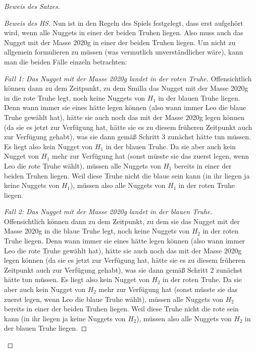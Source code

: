 \begin{proof}[Beweis des Satzes]
\begin{proof}[Beweis des HS]
        Nun ist in den Regeln des Spiels festgelegt, dass erst aufgehört wird, wenn alle Nuggets in einer der beiden 
        Truhen liegen. Also muss auch das Nugget mit der Masse 2020g in einer der beiden Truhen liegen. Um nicht zu 
        allgemein formulieren zu müssen (was vermutlich unverständlicher wäre), kann man die beiden Fälle einzeln 
        betrachten:

        \textit{Fall 1: Das Nugget mit der Masse 2020g landet in der roten Truhe.} Offensichtlich können dann zu dem 
        Zeitpunkt, zu dem Smilla das Nugget mit der Masse 2020g in die rote Truhe legt, noch keine Nuggets von $H_1$ in 
        der blauen Truhe liegen. Denn wann immer sie eines hätte legen können (also wann immer Leo die blaue Truhe 
        gewählt hat), hätte sie auch noch das mit der Masse 2020g legen können (da sie es jetzt zur Verfügung hat, 
        hätte sie es zu diesem früheren Zeitpunkt auch zur Verfügung gehabt), was sie dann gemäß Schritt 3 zunächst 
        hätte tun müssen. Es liegt also kein Nugget von $H_1$ in der blauen Truhe. Da sie aber auch kein Nugget von 
        $H_1$ mehr zur Verfügung hat (sonst müsste sie das zuerst legen, wenn Leo die rote Truhe wählt), müssen alle 
        Nuggets von $H_1$ bereits in einer der beiden Truhen liegen. Weil diese Truhe nicht die blaue sein kann (in 
        ihr liegen ja keine Nuggets von $H_1$), müssen also alle Nuggets von $H_1$ in der roten Truhe liegen.

        \textit{Fall 2: Das Nugget mit der Masse 2020g landet in der blauen Truhe.} Offensichtlich können dann zu dem 
        Zeitpunkt, zu dem sie das Nugget mit der Masse 2020g in die blaue Truhe legt, noch keine Nuggets von $H_2$ in 
        der roten Truhe liegen. Denn wann immer sie eines hätte legen können (also wann immer Leo die rote Truhe 
        gewählt hat), hätte sie auch noch das mit der Masse 2020g legen können (da sie es jetzt zur Verfügung hat, 
        hätte sie es zu diesem früheren Zeitpunkt auch zur Verfügung gehabt), was sie dann gemäß Schritt 2 zunächst 
        hätte tun müssen. Es liegt also kein Nugget von $H_2$ in der roten Truhe. Da sie aber auch kein Nugget von 
        $H_2$ mehr zur Verfügung hat (sonst müsste sie das zuerst legen, wenn Leo die blaue Truhe wählt), müssen alle 
        Nuggets von $H_2$ bereits in einer der beiden Truhen liegen. Weil diese Truhe nicht die rote sein kann (in 
        ihr liegen ja keine Nuggets von $H_2$), müssen also alle Nuggets von $H_2$ in der blauen Truhe liegen.


\end{proof}
\end{proof}
